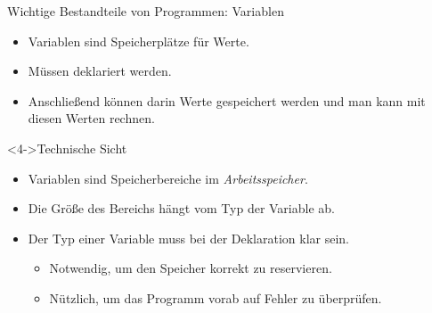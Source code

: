 \newcommand{\intvariablessrcblock}{
    \begin{block}{Integer-Variablen}
        \inputsrcfile[linerange={5-11}]{\examplesdir/concepts/variables.go}
    \end{block}
}

\newcommand{\stringvariablessrcblock}{
    \begin{block}{String-Variablen}
        \inputsrcfile[linerange={13-20}]{\examplesdir/concepts/variables.go}
    \end{block}
}

\newcommand{\listvariablessrcblock}{
    \begin{block}{Listen-Variablen}
        \inputsrcfile[linerange={22-32}]{\examplesdir/concepts/variables.go}
    \end{block}
}

\begin{fframe}
    \begin{block}{Wichtige Bestandteile von Programmen: \alert{Variablen}}
        \begin{itemize}
            \item<1-> Variablen sind \alert{Speicherplätze} für Werte.
            \item<2-> Müssen \alert{deklariert} werden.
            \item<3-> Anschließend können darin Werte gespeichert werden
                    und man kann mit diesen Werten rechnen.
        \end{itemize}
    \end{block}
    \begin{block}<4->{Technische Sicht}
        \begin{itemize}
            \item<4-> Variablen sind \alert{Speicherbereiche} im \emph{Arbeitsspeicher}.
            \item<5-> Die Größe des Bereichs hängt vom \alert{Typ} der Variable ab.
            \item<6-> Der Typ einer Variable muss bei der Deklaration klar sein.
            \begin{itemize}
                \item<7-> Notwendig, um den Speicher korrekt zu reservieren.
                \item<7-> Nützlich, um das Programm vorab auf Fehler zu überprüfen.
            \end{itemize}
        \end{itemize}
    \end{block}
\end{fframe}

